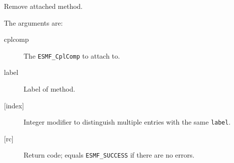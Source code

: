    Remove attached method.
  
   The arguments are:
   \begin{description}
   \item[cplcomp]
     The {\tt ESMF\_CplComp} to attach to.
   \item[label]
     Label of method.
   \item[{[index]}]
     Integer modifier to distinguish multiple entries with the same {\tt label}.
   \item[{[rc]}]
     Return code; equals {\tt ESMF\_SUCCESS} if there are no errors.
   \end{description}
  
\setlength{\parskip}{\oldparskip}
\setlength{\parindent}{\oldparindent}
\setlength{\baselineskip}{\oldbaselineskip}
